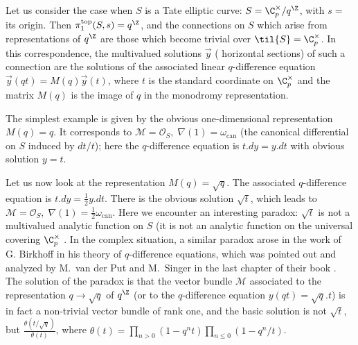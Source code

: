 \begin{exa}\label{exa-tate-ell-curve}
 Let us consider the case when $S$ is a Tate elliptic curve:
 $S=\C_p^{\times}/q^{\Z}$, with $s =$ its origin. Then
 $\pi_1^{\mathrm{top}}(S,s)=q^{\Z}$, and the connections on $S$ which arise
 from representations of $q^{\Z}$ are those which become trivial over
 $\til{S}=\C_p^{\times}$.
 In this correspondence, the multivalued solutions $\vec y$ (\ie 
 horizontal sections) of such a connection are the solutions of the
 associated linear $q$-difference equation $\vec y(qt)=M(q) \vec y(t)$,
 where $t$ is the standard coordinate on $\C_p^{\times}$ and the
 matrix $M(q)$ is the image of $q$ in the monodromy representation.

 The simplest example is given by the obvious one-dimensional 
 representation $M(q)=q$. It corresponds to
 $\mathcal{M}=\mathcal{O}_S,\;\nabla(1)=\omega_{\mathrm{can}}$ (the canonical
 differential on $S$ induced by $dt/t$); here the $q$-difference
 equation is $t.dy=y.dt$ with obvious solution $y=t$. 

 Let us now look at the representation $M(q)=\sqrt{q}$.  The associated
 $q$-difference equation is $t.dy=\frac{1}{2}y.dt$. There is the 
 obvious solution $\sqrt t$, which leads to
 $\mathcal{M}=\mathcal{O}_S,\;\nabla(1)=\frac{1}{2}\omega_{\mathrm{can}}$. 
 Here we encounter an interesting paradox: $\sqrt{t}$ is not a multivalued
 analytic function on $S$ (\ie it is not an analytic function on the
 universal covering $\C_p^{\times}\;$.  In the complex situation, a
 similar paradox arose in the work of G. Birkhoff in his theory of
 $q$-difference equations, which was pointed out
 and analyzed by M.~van der Put and M.~Singer in the last chapter of
 their book \cite{gtode}.  The solution of the paradox is that the vector
 bundle $\mathcal{M}$ associated to the representation $q \rightarrow
 \sqrt{q}$ of $q^{\Z}$ (or to the $q$-difference equation
 $y(qt)=\sqrt{q}.t$) is in fact a non-trivial vector bundle of rank one,
 and the basic solution is not $\sqrt{t}$, but
 $\frac{\theta(t/\sqrt{q})}{\theta(t)}$, where
 $\theta(t)=\prod_{n>0}(1-q^nt)\prod_{n\leq 0}(1-q^n/t)$.

\end{exa}

